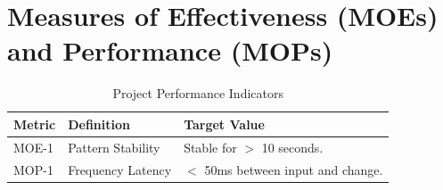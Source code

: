 \section{Measures of Effectiveness (MOEs) and Performance (MOPs)}
\begin{table}[h]
    \centering
    \small
    \begin{tabular}{@{}llp{10cm}@{}}
        \toprule
        \textbf{Metric} & \textbf{Definition} & \textbf{Target Value} \\ \midrule
        MOE-1 & Pattern Stability & Stable for $>$ 10 seconds. \\
        MOP-1 & Frequency Latency & $<$ 50ms between input and change. \\ \bottomrule
    \end{tabular}
    \caption{Project Performance Indicators}
\end{table}
